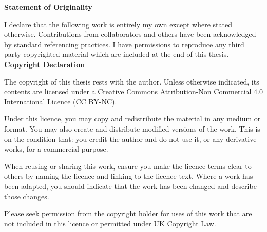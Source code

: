 \textbf{Statement of Originality}

I declare that the following work is entirely my own except where stated otherwise. Contributions from collaborators and others have been acknowledged by standard referencing practices. I have permissions to reproduce any third party copyrighted material which are included at the end of this thesis.
\\
\textbf{Copyright Declaration}

The copyright of this thesis rests with the author. Unless otherwise indicated, its contents are licensed under a Creative Commons Attribution-Non Commercial 4.0 International Licence (CC BY-NC).

Under this licence, you may copy and redistribute the material in any medium or format. You may also create and distribute modified versions of the work. This is on the condition that: you credit the author and do not use it, or any derivative works, for a commercial purpose.

When reusing or sharing this work, ensure you make the licence terms clear to others by naming the licence and linking to the licence text. Where a work has been adapted, you should indicate that the work has been changed and describe those changes.

Please seek permission from the copyright holder for uses of this work that are not included in this licence or permitted under UK Copyright Law.